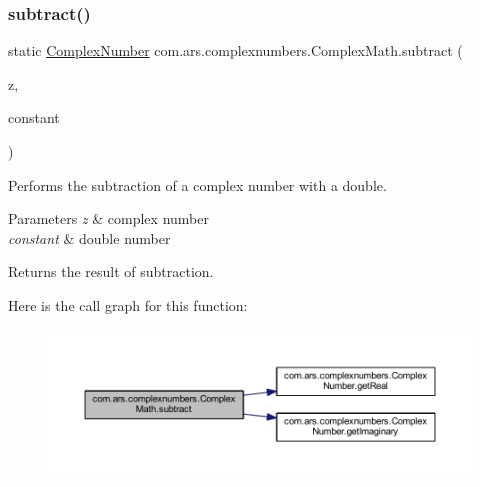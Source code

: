 \subsubsection{\texorpdfstring{subtract()}{subtract()}\hspace{0.1cm}{\footnotesize\ttfamily [2/2]}}
{\footnotesize\ttfamily static \hyperlink{classcom_1_1ars_1_1complexnumbers_1_1_complex_number}{Complex\+Number} com.\+ars.\+complexnumbers.\+Complex\+Math.\+subtract (\begin{DoxyParamCaption}\item[{\hyperlink{classcom_1_1ars_1_1complexnumbers_1_1_complex_number}{Complex\+Number}}]{z,  }\item[{double}]{constant }\end{DoxyParamCaption})\hspace{0.3cm}{\ttfamily [static]}}

Performs the subtraction of a complex number with a double. 
\begin{DoxyParams}{Parameters}
{\em z} & complex number \\
\hline
{\em constant} & double number \\
\hline
\end{DoxyParams}
\begin{DoxyReturn}{Returns}
the result of subtraction. 
\end{DoxyReturn}
Here is the call graph for this function\+:
\nopagebreak
\begin{figure}[H]
\begin{center}
\leavevmode
\includegraphics[width=350pt]{classcom_1_1ars_1_1complexnumbers_1_1_complex_math_a8ec234a476d41f2f32113eb13a0f7630_cgraph}
\end{center}
\end{figure}
\hypertarget{classcom_1_1ars_1_1complexnumbers_1_1_complex_math_af260af539eaec79d57b7e5363bda686e}{}\label{classcom_1_1ars_1_1complexnumbers_1_1_complex_math_af260af539eaec79d57b7e5363bda686e} 

